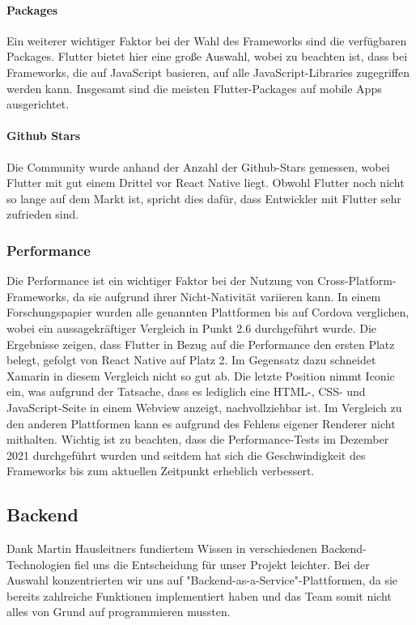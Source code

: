 \paragraph{Packages}
\newline

Ein weiterer wichtiger Faktor bei der Wahl des Frameworks sind die verfügbaren Packages. Flutter bietet hier eine große Auswahl, wobei zu beachten ist, dass bei Frameworks, die auf JavaScript basieren, auf alle JavaScript-Libraries zugegriffen werden kann. Insgesamt sind die meisten Flutter-Packages auf mobile Apps ausgerichtet.

\paragraph{Github Stars}
\newline

Die Community wurde anhand der Anzahl der Github-Stars gemessen, wobei Flutter mit gut einem Drittel vor React Native liegt. Obwohl Flutter noch nicht so lange auf dem Markt ist, spricht dies dafür, dass Entwickler mit Flutter sehr zufrieden sind.

\subsubsection{Performance}
Die Performance ist ein wichtiger Faktor bei der Nutzung von Cross-Platform-Frameworks, da sie aufgrund ihrer Nicht-Nativität variieren kann. In einem Forschungspapier \cite{Anwar2021} wurden alle genannten Plattformen bis auf Cordova verglichen, wobei ein aussagekräftiger Vergleich in Punkt 2.6 durchgeführt wurde. Die Ergebnisse zeigen, dass Flutter in Bezug auf die Performance den ersten Platz belegt, gefolgt von React Native auf Platz 2. Im Gegensatz dazu schneidet Xamarin in diesem Vergleich nicht so gut ab. Die letzte Position nimmt Iconic ein, was aufgrund der Tatsache, dass es lediglich eine HTML-, CSS- und JavaScript-Seite in einem Webview anzeigt, nachvollziehbar ist. Im Vergleich zu den anderen Plattformen kann es aufgrund des Fehlens eigener Renderer nicht mithalten.
Wichtig ist zu beachten, dass die Performance-Tests im Dezember 2021 durchgeführt wurden und seitdem hat sich die Geschwindigkeit des Frameworks bis zum aktuellen Zeitpunkt erheblich verbessert.


\subsection
{Backend}
Dank Martin Hausleitners fundiertem Wissen in verschiedenen Backend-Technologien fiel uns die Entscheidung für unser Projekt leichter. Bei der Auswahl konzentrierten wir uns auf "Backend-as-a-Service"-Plattformen, da sie bereits zahlreiche Funktionen implementiert haben und das Team somit nicht alles von Grund auf programmieren mussten.


